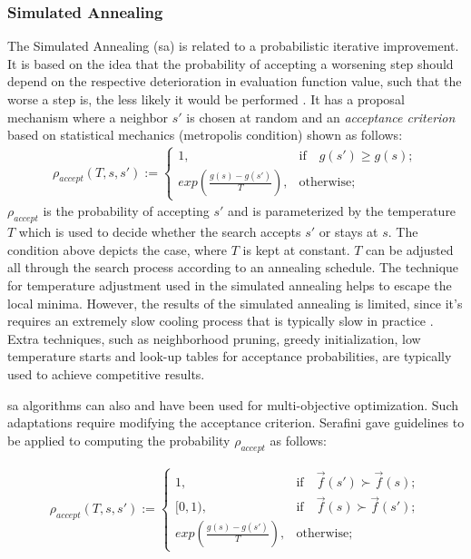 \subsubsection{Simulated Annealing}
The Simulated Annealing (\gls{sa}) is related to a probabilistic iterative improvement. It is based on the idea that the probability of accepting a worsening step should depend on the respective deterioration in evaluation function value, such that the worse a step is, the less likely it would be performed \parencite{HolgerH2013StochasticApplications}. It has a proposal mechanism where a neighbor $s'$ is chosen at random and an \textit{acceptance criterion} based on statistical mechanics (metropolis condition) shown as follows:
\begin{align*}
    \rho_{accept}(T,s,s') := \begin{cases}
                            1, &\text{if}\quad g(s') \geq g(s);\\
                            exp(\frac{g(s)-g(s')}{T}), &\text{otherwise};
                             \end{cases}
\end{align*}
$\rho_{accept}$ is the probability of accepting $s'$ and is parameterized by the temperature $T$ which is used to decide whether the search accepts $s'$ or stays at $s$. The condition above depicts the case, where $T$ is kept at constant. $T$ can be adjusted all through the search process according to an annealing schedule. The technique for temperature adjustment used in the simulated annealing helps to escape the local minima. However, the results of the simulated annealing is limited, since it's requires an extremely slow cooling process that is typically slow in practice \parencite{HolgerH2013StochasticApplications}. Extra techniques, such as neighborhood pruning, greedy initialization, low temperature starts and look-up tables for acceptance probabilities, are typically used to achieve competitive results. 

\Gls{sa} algorithms can also and have been used for multi-objective optimization. Such adaptations require modifying the acceptance criterion. Serafini \parencite{Serafini1994SimulatedProblems} gave guidelines to be applied to computing the probability $\rho_{accept}$ as follows:

\begin{align*}
    \rho_{accept}(T,s,s') := \begin{cases}
                            1, &\text{if}\quad \Vec{f}(s') \succ \Vec{f}(s);\\
                            [0,1), &\text{if}\quad \Vec{f}(s) \succ \Vec{f}(s');\\
                            exp(\frac{g(s)-g(s')}{T}), &\text{otherwise};
                             \end{cases}
\end{align*}



